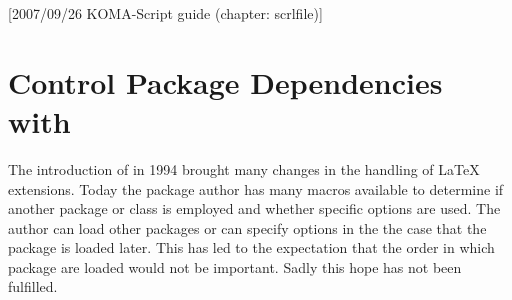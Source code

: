 %
%
%
%
%
%
%
%
% 
%
%
%
%

[2007/09/26 KOMA-Script guide (chapter: scrlfile)]


\chapter{Control Package Dependencies with }


\begin{Explain}
  The introduction of {\LaTeXe} in 1994 brought many changes in the
  handling of {\LaTeX} extensions.  Today the package author has many
  macros available to determine if another package or class is
  employed and whether specific options are used.  The author can load
  other packages or can specify options in the the case that the
  package is loaded later.  This has led to the expectation that the
  order in which package are loaded would not be important.  Sadly
  this hope has not been fulfilled.
\end{Explain}

